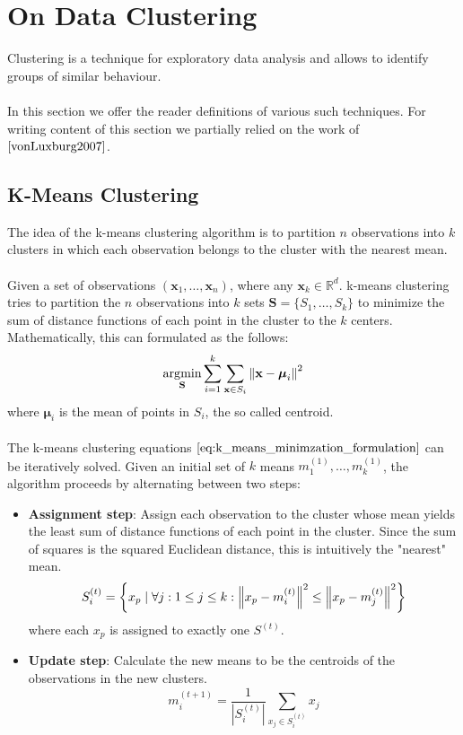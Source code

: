 \section{On Data Clustering}
Clustering is a technique for exploratory data analysis and allows to identify groups of similar behaviour. \\ \\
In this section we offer the reader definitions of various such techniques. For writing content of this section we partially relied on the work of $\cite{vonLuxburg2007}$.

\subsection{K-Means Clustering}
The idea of the k-means clustering algorithm is to partition $n$ observations into $k$ clusters in which each observation belongs to the cluster with the nearest mean. \\ \\
Given a set of observations $(\textbf{x}_1, \dots, \textbf{x}_n)$, where any $\textbf{x}_k \in \mathbb{R}^d$. k-means clustering tries to partition the $n$ observations into $k$ sets $\textbf{S} = \{ S_1, \dots, S_k\}$ to minimize the sum of distance functions of each point in the cluster to the $k$ centers. Mathematically, this can formulated as the follows:
\begin{equation}
	\operatorname*{\arg\!\min}_{\textbf{S}} \sum_{i=1}^k \sum_{\textbf{x} \in S_i} \left\lVert\textbf{x} - {\boldsymbol {\mu }}_{i}\right\rVert^2
\label{eq:k_means_minimzation_formulation}
\end{equation}
where ${\boldsymbol {\mu }}_{i}$ is the mean of points in $S_i$, the so called centroid. \\ \\
The k-means clustering equations $\ref{eq:k_means_minimzation_formulation}$ can be iteratively solved. Given an initial set of $k$ means $m_1^{(1)}, \dots, m_k^{(1)}$, the algorithm proceeds by alternating between two steps:
\begin{itemize}
\item \textbf{Assignment step}: Assign each observation to the cluster whose mean yields the least sum of distance functions of each point in the cluster. Since the sum of squares is the squared Euclidean distance, this is intuitively the "nearest" mean. 
\begin{equation}
  	S_i^{(t)} = \left\{ x_p \mid \forall j: 1 \leq j \leq k: \left\lVert x_p - m_i^{(t)}\right\rVert^2 \leq \left\lVert x_p - m_j^{(t)}\right\rVert^2 \right\}
\end{equation} 
where each $x_p$ is assigned to exactly one $S^{(t)}$.
\item \textbf{Update step}: Calculate the new means to be the centroids of the observations in the new clusters. 
\begin{equation}
	m_i^{(t+1)} = \frac{1}{\left| S_i^{(t)} \right| } \sum_{x_j \in S_i^{(t)}} x_j
\end{equation}
\end{itemize}
